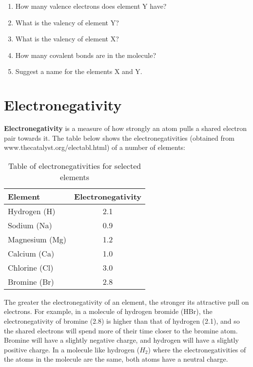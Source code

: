 {\begin{enumerate}
{	\begin{enumerate}
	\item{How many valence electrons does element Y have?}
	\item{What is the valency of element Y?}
	\item{What is the valency of element X?}
	\item{How many covalent bonds are in the molecule?}
	\item{Suggest a name for the elements X and Y.}
	\end{enumerate}
}

\end{enumerate}
\practiceinfo
}







\section{Electronegativity}

\textbf{Electronegativity} is a measure of how strongly an atom pulls a shared electron pair towards it. The table below shows the electronegativities (obtained from www.thecatalyst.org/electabl.html) of a number of elements:

\begin{table}[!h]
\begin{center}
\caption{Table of electronegativities for selected elements}
\begin{tabular}{|l|c|}\hline
\textbf{Element} & \textbf{Electronegativity}\\\hline
Hydrogen (H) & 2.1\\\hline
Sodium (Na) & 0.9\\\hline
Magnesium (Mg) & 1.2\\\hline
Calcium (Ca) & 1.0\\\hline
Chlorine (Cl) & 3.0\\\hline
Bromine (Br) & 2.8\\\hline
\end{tabular}
\end{center}
\end{table}


The greater the electronegativity of an element, the stronger its attractive pull on electrons. For example, in a molecule of hydrogen bromide (HBr), the electronegativity of bromine (2.8) is higher than that of hydrogen (2.1), and so the shared electrons will spend more of their time closer to the bromine atom. Bromine will have a slightly negative charge, and hydrogen will have a slightly positive charge. In a molecule like hydrogen ($H_{2}$) where the electronegativities of the atoms in the molecule are the same, both atoms have a neutral charge. \\

